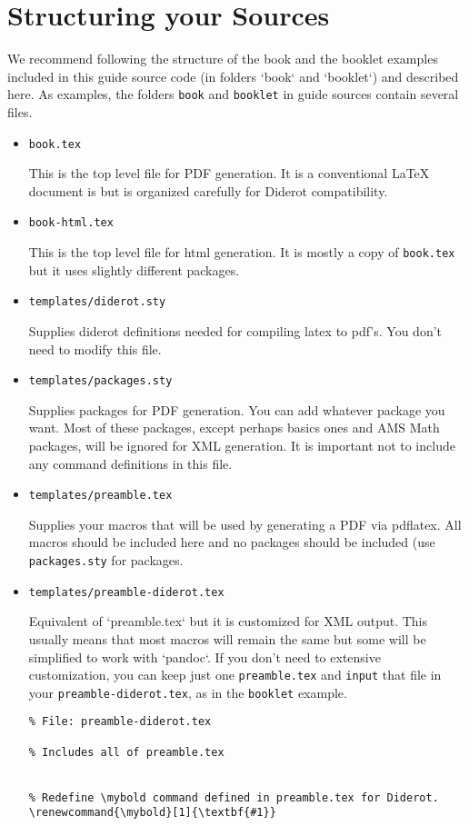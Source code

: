 \section{Structuring your Sources}
\label{sec:publish::latex-structure}
%
We recommend following the structure
of the book and the booklet examples included in this guide source
code (in folders `book` and `booklet`) and described here.
%
As examples, 
the folders \lstinline`book` and \lstinline`booklet` in guide sources contain several files.
%
\begin{itemize}
\item \lstinline`book.tex`

This is the top level file for PDF generation.  It is a conventional LaTeX document is but is organized carefully for Diderot compatibility.

\item \lstinline`book-html.tex`

This is the top level file for html generation.  It is mostly a copy of \lstinline`book.tex` but it uses slightly different packages.

\item \lstinline`templates/diderot.sty`

Supplies diderot definitions needed for compiling latex to pdf's.
You don't need to modify this file.

\item \lstinline`templates/packages.sty`

Supplies packages for PDF generation.  You can add whatever package
you want.  Most of these packages, except perhaps basics ones and AMS
Math packages, will be ignored for XML generation.  It is important not to include any command definitions in this file.

\item \lstinline`templates/preamble.tex` 

Supplies your macros that will be used by generating a PDF via pdflatex.  All macros should be included here and no packages should be included (use \lstinline`packages.sty` for packages.  


\item \lstinline`templates/preamble-diderot.tex` 

Equivalent of \lstlinline`preamble.tex` but it is customized for XML output.  This usually means that most macros will remain the same but some will be simplified to work with `pandoc`.  If you don't need to extensive customization, you can keep just one \lstinline`preamble.tex` and \lstinline`input` that file in your \lstinline`preamble-diderot.tex`, as in the \lstinline`booklet` example.
%
\begin{lstlisting}
% File: preamble-diderot.tex

% Includes all of preamble.tex


% Redefine \mybold command defined in preamble.tex for Diderot.
\renewcommand{\mybold}[1]{\textbf{#1}}
\end{lstlisting}
\end{itemize}    

